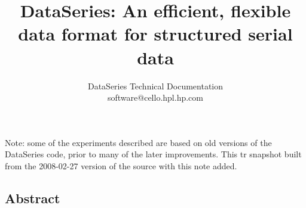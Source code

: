 \documentclass[twocolumn, 10pt]{article}
\begin{document}
\newcommand{\DataSeries}{DataSeries}
\newcommand{\DS}{DS}

\title{\Large \bf \DataSeries{}: An efficient, flexible data format for structured serial data}

\author{
\begin{tabular}{c}
DataSeries Technical Documentation \\
software@cello.hpl.hp.com \\
\end{tabular}
}



\maketitle


{ \Large Note: some of the experiments described are
  based on old versions of the DataSeries code, prior to many of the
  later improvements.  This tr snapshot built from the 2008-02-27
  version of the source with this note added.  }
\subsection*{Abstract}






% 

%

%

\end{document}
